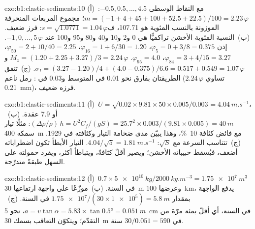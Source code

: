 \begin{solution}{exo:b1:clastic-sediments:10}
(أ)~مع النقاط الوسطى $-0.5, 0.5, \ldots, 4.5$: $m = (-1 + 4 + 45 + 100 + 52.5
+ 22.5)/100 = 2.23\,\varphi$؛ مجموع المربعات المنحرفة الموزونة بالنسب المئوية هو \num{107.71}، ف$s = \sqrt{1.0771} = 1.04\,\varphi$:
فرز ضعيف. (ب)~النسبة المئوية الأخشن تراكميًّا هي 0 و\num{2} و\num{10} و\num{40} و\num{80} و\num{95} و\num{100} عند $-1, 0, \ldots, 5\,\varphi$. إذن $\varphi_5 = 0 + 3/8 = 0.375$،
$\varphi_{16} = 1 + 6/30 = 1.20$، $\varphi_{50} = 2 + 10/40 = 2.25$،
$\varphi_{84} = 3 + 4/15 = 3.27$، $\varphi_{95} = 4.0$. $M_z = (1.20 + 2.25 +
3.27)/3 = 2.24\,\varphi$ و$\sigma_I = (3.27 - 1.20)/4 + (4.0 - 0.375)/6.6 =
0.517 + 0.549 = 1.07\,\varphi$. (ج)~تتفق الطريقتان بفارق نحو \num{0.01} في المتوسط و\num{0.03} في : رمل ناعم ($2.24\,\varphi$ تساوي \qty{0.21}{mm})، فرزه ضعيف.
\end{solution}

\begin{solution}{exo:b1:clastic-sediments:11}
(أ)~$U = \sqrt{0.02 \times 9.81 \times 50 \times 0.005/0.003} =
\qty{4.04}{m.s^{-1}}$، أو 7.9 عقدة. (ب)~$(\Delta\rho/\rho)\,h = U^2
C_f/(gS) = 25.7^2 \times 0.003/(9.81 \times 0.005) = \qty{40}{m}$: مثلًا تيار سمكه \qty{400}{m} مع فائض كثافة \qty{10}{\percent}، وهذا يبيّن مدى ضخامة التيار وكثافته في 1929. (ج)~تتناسب السرعة مع $\sqrt S$: $4.04/\sqrt 5 = \qty{1.81}{m.s^{-1}}$. التيار الأبطأ تكون اضطراباته أضعف، فيُسقط حبيباته الأخشن؛ ويصير أقلّ كثافةً، ويتباطأ أكثر، ويفرد حمولته على السهل طبقةً متدرّجة.
\end{solution}

\begin{solution}{exo:b1:clastic-sediments:12}
(أ)~$0.7 \times \qty{5e10}{kg}/\qty{2000}{kg.m^{-3}} = \qty{1.75e7}{m^3}$ في
السنة. (ب)~موزّعًا على واجهة ارتفاعها \qty{30}{m} وعرضها \qty{100}{km}، يدفع الواجهة بمقدار $\num{1.75e7}/(30 \times \num{1e5}) = \qty{5.8}{m}$ في
السنة. (ج)~$a = v\tan\alpha = 5.83 \times \tan\ang{0.5} = \qty{0.051}{m}$، نحو
\qty{5}{cm} في السنة، أي أقلّ بمئة مرّة من التقدّم؛ ويتكوّن التعاقب بسمك \qty{30}{m} في $30/0.051 = 590$ سنة.
\end{solution}

